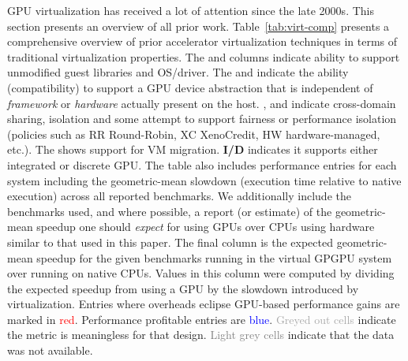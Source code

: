 GPU virtualization has received a lot of attention since the late 2000s. This
section presents an overview of all prior work.
Table~\ref{tab:virt-comp} presents a comprehensive overview of prior
accelerator virtualization techniques in terms of traditional virtualization
properties. The \textbf{\libnomod} and \textbf{\osnomod}
columns indicate ability to support unmodified guest libraries and OS/driver.
The \textbf{\libflex} and \textbf{\hwflex} indicate the ability
(compatibility) to support a GPU device abstraction that is independent of
\textit{framework} or \textit{hardware} actually present on the host.
\textbf{\sharing}, \textbf{\isolation}
and \textbf{\scheduling} indicate cross-domain sharing, isolation and
some attempt to support fairness or performance isolation
(policies such as RR Round-Robin, XC XenoCredit, HW hardware-managed, etc.).
The \textbf{\mobility} shows support for VM migration.
\textbf{I/D} indicates it supports either integrated or discrete GPU. The
table also includes performance entries for each system including the
geometric-mean slowdown (execution time relative to native execution) across
all reported benchmarks. We additionally include the benchmarks used, and
where possible, a report (or estimate) of the geometric-mean speedup one
should \emph{expect} for using GPUs over CPUs using hardware similar to that
used in this paper. The final column is the expected geometric-mean speedup
for the given benchmarks running in the virtual GPGPU system over running on
native CPUs. Values in this column were computed by dividing the expected
speedup from using a GPU by the slowdown introduced by virtualization.
Entries where overheads eclipse GPU-based performance gains are marked in
\textcolor{red}{red}. Performance profitable entries are
\textcolor{blue}{blue}. \textcolor{darkgray}{Greyed out cells} indicate the
metric is meaningless for that design. \textcolor{gray}{Light grey cells}
indicate that the data was not available.
